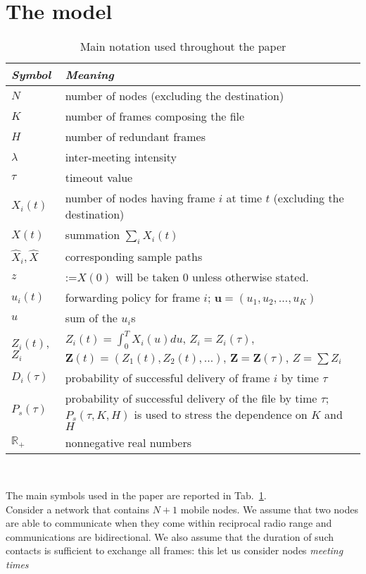 \documentclass[10pt,twocolumn,conference,final]{IEEEtran}
\newcommand{\Z}{\mathbf Z}
\begin{document}
\section{The model}\label{sec:model}
\begin{table}[t]\caption{Main notation used throughout the paper}
\centering
\begin{tabular}{|p{}|p{}|}
\hline
{\it Symbol} & {\it Meaning}\\
\hline
$N$ & number of nodes (excluding the destination)\\
$K$ & number of frames composing the file\\
$H$ & number of redundant frames\\
$\lambda$ & inter-meeting intensity\\
$\tau$ & timeout value\\
$X_i(t)$ & number of nodes having frame $i$ at time $t$ (excluding the destination) \\
$X(t)$ & summation $ \sum_i X_i(t)$\\
$\widehat X_i,\widehat X$ & corresponding sample paths\\
$z$ & :=$X(0)$ will be taken 0 unless otherwise stated.\\
$u_i(t)$ & forwarding policy for frame $i$; $\mathbf u=(u_1,u_2,\ldots,u_K)$ \\
$u$ & sum of the $u_i$s \\
$Z_i(t)$,$Z_i$&$Z_i(t)=\int_0^T X_i(u)du$, $Z_i=Z_i(\tau)$, $\mathbf Z(t)=(Z_1(t),Z_2(t),\ldots)$, $\Z=\Z(\tau)$, $Z=\sum Z_i$\\
$D_i(\tau)$& probability of successful delivery of frame $i$ by time $\tau$\\
$P_s(\tau)$& probability of successful delivery of the file by time $\tau$; $P_s(\tau,K,H)$ is
used to stress the dependence on $K$ and $H$\\
${\mathbb R}_+$ & nonnegative real numbers \\
\hline
\end{tabular}\\[-5mm]
\label{tab:notation}
\end{table}
The main symbols used in the paper are reported in Tab.~\ref{tab:notation}.
\\
Consider a network that contains $N+1$ mobile nodes. We assume that two nodes are able to
communicate when they come within reciprocal radio range and 
communications are bidirectional. We also assume that the duration of such contacts is 
sufficient to exchange all frames: this let us consider nodes {\em meeting times} 
\end{document}

